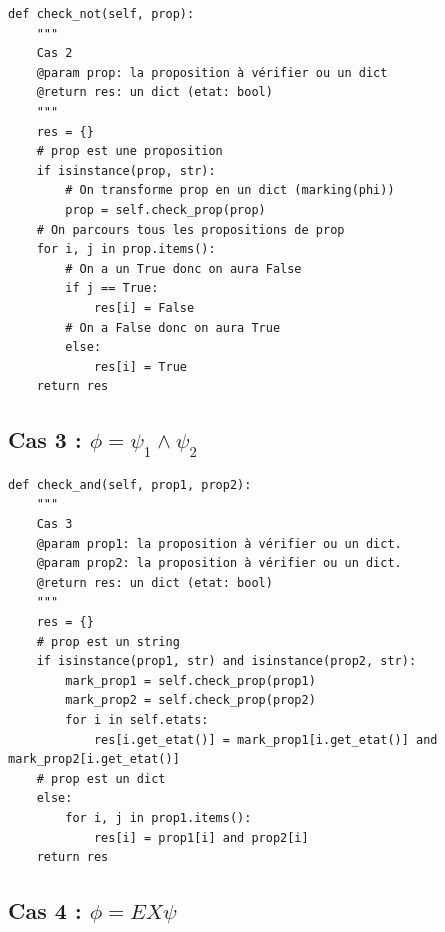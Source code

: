 \documentclass[12pt,a4paper]{report}
\begin{document}
\begin{verbatim}
def check_not(self, prop):
    """
    Cas 2
    @param prop: la proposition à vérifier ou un dict
    @return res: un dict (etat: bool)
    """
    res = {}
    # prop est une proposition
    if isinstance(prop, str):
        # On transforme prop en un dict (marking(phi))
        prop = self.check_prop(prop)
    # On parcours tous les propositions de prop
    for i, j in prop.items():
        # On a un True donc on aura False
        if j == True:
            res[i] = False
        # On a False donc on aura True
        else:
            res[i] = True
    return res
\end{verbatim}

\subsection*{Cas 3 : $\phi = \psi_{1} \land \psi_{2}$}

\begin{verbatim}
def check_and(self, prop1, prop2):
    """
    Cas 3
    @param prop1: la proposition à vérifier ou un dict.
    @param prop2: la proposition à vérifier ou un dict.
    @return res: un dict (etat: bool)
    """
    res = {}
    # prop est un string
    if isinstance(prop1, str) and isinstance(prop2, str):
        mark_prop1 = self.check_prop(prop1)
        mark_prop2 = self.check_prop(prop2)
        for i in self.etats:
            res[i.get_etat()] = mark_prop1[i.get_etat()] and mark_prop2[i.get_etat()]
    # prop est un dict
    else:
        for i, j in prop1.items():
            res[i] = prop1[i] and prop2[i]        
    return res
\end{verbatim}

\subsection*{Cas 4 : $\phi = EX \psi$}
\end{document}
